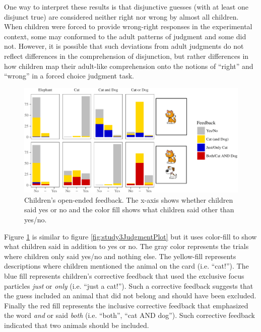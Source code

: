 \documentclass[oneside]{report}
\theoremstyle{definition}
\theoremstyle{definition}
\theoremstyle{definition}
\theoremstyle{remark}
\begin{document}
One way to interpret these results is that disjunctive guesses (with at
least one disjunct true) are considered neither right nor wrong by
almost all children. When children were forced to provide wrong-right
responses in the experimental context, some may conformed to the adult
patterns of judgment and some did not. However, it is possible that such
deviations from adult judgments do not reflect differences in the
comprehension of disjunction, but rather differences in how children map
their adult-like comprehension onto the notions of ``right'' and
``wrong'' in a forced choice judgment task.
\begin{figure}[t]

{\centering \includegraphics{figs/feedbackFillPlot-1} 

}

\caption{Children's open-ended feedback. The x-axis shows whether children said yes or no and the color fill shows what children said other than yes/no.}\label{fig:feedbackFillPlot}
\end{figure}
Figure \ref{fig:feedbackFillPlot} is similar to figure
\ref{fig:study3JudgmentPlot} but it uses color-fill to show what
children said in addition to yes or no. The gray color represents the
trials where children only said yes/no and nothing else. The yellow-fill
represents descriptions where children mentioned the animal on the card
(i.e. ``cat!''). The blue fill represents children's corrective feedback
that used the exclusive focus particles \emph{just} or \emph{only} (i.e.
``just a cat!''). Such a corrective feedback suggests that the guess
included an animal that did not belong and should have been excluded.
Finally the red fill represents the inclusive corrective feedback that
emphasized the word \emph{and} or said \emph{both} (i.e. ``both'', ``cat
AND dog''). Such corrective feedback indicated that two animals should
be included.
\end{document}
